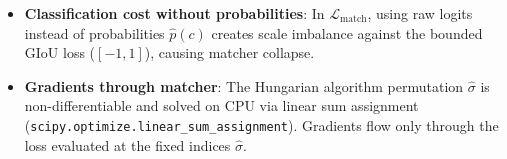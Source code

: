\begin{trap}
\begin{itemize}
\item \textbf{Classification cost without probabilities}: In $\mathcal{L}_{\text{match}}$, using raw logits instead of probabilities $\hat{p}(c)$ creates scale imbalance against the bounded GIoU loss ($[-1, 1]$), causing matcher collapse.
\item \textbf{Gradients through matcher}: The Hungarian algorithm permutation $\hat{\sigma}$ is non-differentiable and solved on CPU via linear sum assignment (\lstinline|scipy.optimize.linear_sum_assignment|). Gradients flow only through the loss evaluated at the fixed indices $\hat{\sigma}$.
\end{itemize}
\end{trap}
